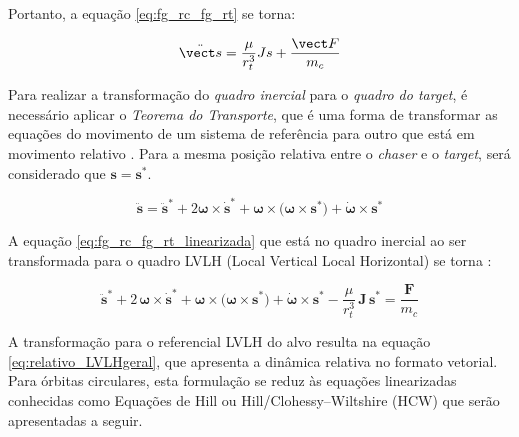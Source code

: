Portanto, a equação \eqref{eq:fg_rc_fg_rt} se torna:

\begin{equation}
\label{eq:fg_rc_fg_rt_linearizada}  
\ddot{\vect s} = \frac{\mu}{r_t^3} Js + \frac{\vect F}{m_c}
\end{equation}

Para realizar a transformação do \emph{quadro inercial} para o \emph{quadro do target}, é necessário aplicar o \emph{Teorema do Transporte}, que é uma forma de transformar as equações do movimento de um sistema de referência para outro que está em movimento relativo \cite{wie2008space, symon1979}. Para a mesma posição relativa entre o \emph{chaser} e o \emph{target}, será considerado que $\mathbf s = \mathbf s^{*}$.

\begin{equation}
\label{eq:TransporteSymon1979}
\ddot{\mathbf s} = 
\ddot{\mathbf s}^{*}
+ 2\boldsymbol\omega\times\dot{\mathbf s}^{*}
+ \boldsymbol\omega\times\big(\boldsymbol\omega\times\mathbf s^{*}\big)
+ \dot{\boldsymbol\omega}\times\mathbf s^{*}
\end{equation}

A equação \eqref{eq:fg_rc_fg_rt_linearizada} que está no quadro inercial ao ser transformada para o quadro LVLH (Local Vertical Local Horizontal) se torna \cite{fehse2003}:

\begin{equation}
\label{eq:relativo_LVLHgeral}
\ddot{\mathbf s}^{*}
+ 2\,\boldsymbol\omega\times\dot{\mathbf s}^{*}
+ \boldsymbol\omega\times\big(\boldsymbol\omega\times\mathbf s^{*}\big)
+ \dot{\boldsymbol\omega}\times\mathbf s^{*}
- \frac{\mu}{r_t^3}\,\mathbf J\,\mathbf s^{*}
= \frac{\mathbf F}{m_c}
\end{equation}

A transformação para o referencial LVLH do alvo resulta na equação \eqref{eq:relativo_LVLHgeral}, que apresenta a dinâmica relativa no formato vetorial.
Para órbitas circulares, esta formulação se reduz às equações linearizadas conhecidas como Equações de Hill ou Hill/Clohessy--Wiltshire (HCW) que serão apresentadas a seguir.











